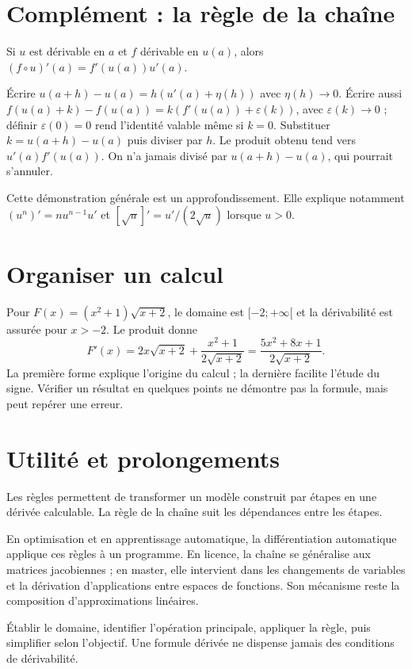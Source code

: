\documentclass[../cours_1re.tex]{subfiles}
\begin{document}
\section{Complément : la règle de la chaîne}
\begin{theoreme}
Si $u$ est dérivable en $a$ et $f$ dérivable en $u(a)$, alors
$(f\circ u)'(a)=f'(u(a))u'(a)$.
\end{theoreme}
\begin{demonstration}
Écrire $u(a+h)-u(a)=h(u'(a)+\eta(h))$ avec $\eta(h)\to0$.
Écrire aussi $f(u(a)+k)-f(u(a))=k(f'(u(a))+\varepsilon(k))$, avec $\varepsilon(k)\to0$ ; définir $\varepsilon(0)=0$ rend l'identité valable même si $k=0$.
Substituer $k=u(a+h)-u(a)$ puis diviser par $h$. Le produit obtenu tend vers $u'(a)f'(u(a))$. On n'a jamais divisé par $u(a+h)-u(a)$, qui pourrait s'annuler.
\end{demonstration}
Cette démonstration générale est un approfondissement. Elle explique notamment
$(u^n)'=nu^{n-1}u'$ et $[\sqrt u]'=u'/(2\sqrt u)$ lorsque $u>0$.
\begin{finchapitre}
\section{Organiser un calcul}
Pour $F(x)=(x^2+1)\sqrt{x+2}$, le domaine est $[-2;+\infty[$ et la dérivabilité est assurée pour $x>-2$.
Le produit donne
\[
F'(x)=2x\sqrt{x+2}+\frac{x^2+1}{2\sqrt{x+2}}
=\frac{5x^2+8x+1}{2\sqrt{x+2}}.
\]
La première forme explique l'origine du calcul ; la dernière facilite l'étude du signe. Vérifier un résultat en quelques points ne démontre pas la formule, mais peut repérer une erreur.


\section{Utilité et prolongements}
Les règles permettent de transformer un modèle construit par étapes en une dérivée calculable. La règle de la chaîne suit les dépendances entre les étapes.

En optimisation et en apprentissage automatique, la différentiation automatique applique ces règles à un programme. En licence, la chaîne se généralise aux matrices jacobiennes ; en master, elle intervient dans les changements de variables et la dérivation d'applications entre espaces de fonctions. Son mécanisme reste la composition d'approximations linéaires.
\begin{retenir}
Établir le domaine, identifier l'opération principale, appliquer la règle, puis simplifier selon l'objectif. Une formule dérivée ne dispense jamais des conditions de dérivabilité.
\end{retenir}
\end{finchapitre}
\end{document}
